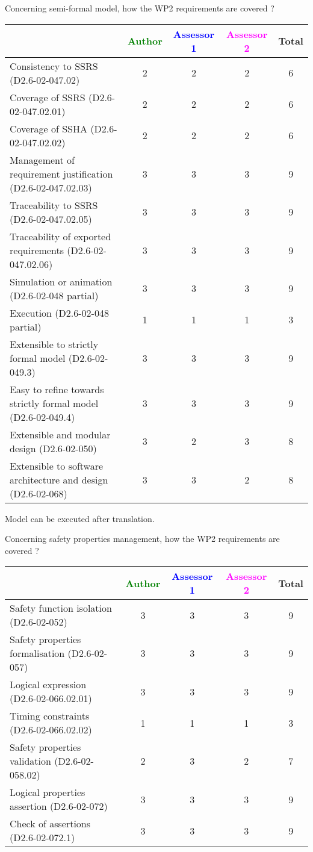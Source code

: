 Concerning semi-formal model, how the WP2 requirements are covered ?

\begin{tabular}{|l | c | c | c | c|}
\hline
& \textcolor{green}{Author} & \textcolor{blue}{Assessor 1} & \textcolor{magenta}{Assessor 2} & Total \\
\hline 
Consistency to SSRS (D2.6-02-047.02) & 2 & 2 & 2 & 6 \\
\hline
Coverage of SSRS (D2.6-02-047.02.01)  & 2 & 2 & 2 & 6 \\
\hline
Coverage of SSHA (D2.6-02-047.02.02)  & 2 & 2 & 2 & 6 \\
\hline
Management of requirement justification (D2.6-02-047.02.03)  & 3 & 3 & 3 & 9  \\
\hline
Traceability to  SSRS (D2.6-02-047.02.05)  & 3 & 3 & 3 & 9 \\
\hline
Traceability of exported requirements (D2.6-02-047.02.06)  & 3 & 3 & 3 & 9 \\
\hline
Simulation or animation (D2.6-02-048 partial)  & 3 & 3 & 3 & 9 \\
\hline
Execution (D2.6-02-048 partial)  & 1 & 1 & 1 & 3 \\
\hline
Extensible to strictly formal model (D2.6-02-049.3) & 3 & 3 & 3 &  9 \\
\hline
Easy to  refine towards strictly formal model (D2.6-02-049.4) & 3 & 3 & 3 & 9 \\
\hline
Extensible and modular design (D2.6-02-050)  & 3 & 2 & 3 & 8  \\
\hline
Extensible to software architecture and design (D2.6-02-068)   & 3 & 3 & 2 & 8 \\
\hline
\end{tabular}


\begin{author_comment}
Model can be executed after translation.
\end{author_comment}

Concerning safety properties management, how the WP2 requirements are covered ?

\begin{tabular}{|l | c | c | c | c|}
\hline
& \textcolor{green}{Author} & \textcolor{blue}{Assessor 1} & \textcolor{magenta}{Assessor 2} & Total \\
\hline 
Safety function isolation (D2.6-02-052)  & 3 & 3 & 3 & 9 \\
\hline 
Safety properties formalisation (D2.6-02-057)  & 3 & 3 & 3 & 9 \\
\hline
Logical expression (D2.6-02-066.02.01)  & 3 & 3 & 3 & 9 \\
\hline
Timing constraints (D2.6-02-066.02.02)  & 1 & 1 & 1 & 3 \\
\hline
Safety properties validation (D2.6-02-058.02)  & 2 & 3 & 2 & 7 \\
\hline
Logical properties assertion (D2.6-02-072)  & 3 & 3 & 3 & 9 \\
\hline
Check  of assertions (D2.6-02-072.1)  & 3 & 3 & 3 & 9 \\
\hline
\end{tabular}


